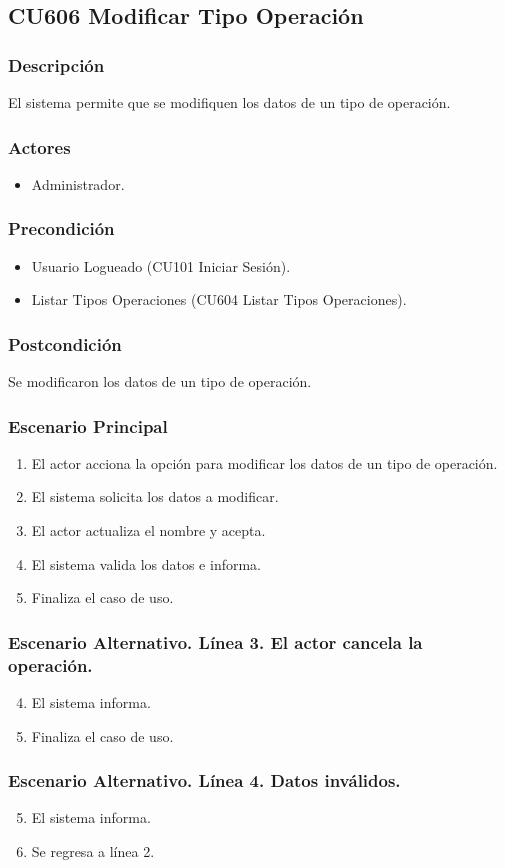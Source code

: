 \subsection{CU606 Modificar Tipo Operaci\'{o}n}
\subsubsection{Descripci\'{o}n}
El sistema permite que se modifiquen los datos de un tipo de operaci\'{o}n.
\subsubsection{Actores}
\begin{itemize}
\item Administrador.
\end{itemize}
\subsubsection{Precondici\'{o}n}
\begin{itemize}
\item Usuario Logueado (CU101 Iniciar Sesi\'{o}n).
\item Listar Tipos Operaciones (CU604 Listar Tipos Operaciones).
\end{itemize}
\subsubsection{Postcondici\'{o}n}
Se modificaron los datos de un tipo de operaci\'{o}n.
\subsubsection{Escenario Principal}
\begin{enumerate}
\item El actor acciona la opci\'{o}n para modificar los datos de un tipo de operaci\'{o}n.
\item El sistema solicita los datos a modificar.
\item El actor actualiza el nombre y acepta.
\item El sistema valida los datos e informa.
\item Finaliza el caso de uso.
\end{enumerate}
\subsubsection{Escenario Alternativo. L\'{i}nea 3. El actor cancela la operaci\'{o}n.}
\begin{enumerate}
\setcounter{enumi}{3}
\item El sistema informa.
\item Finaliza el caso de uso.
\end{enumerate}
\subsubsection{Escenario Alternativo. L\'{i}nea 4. Datos inv\'{a}lidos.}
\begin{enumerate}
\setcounter{enumi}{4}
\item El sistema informa.
\item Se regresa a l\'{i}nea 2.
\end{enumerate}